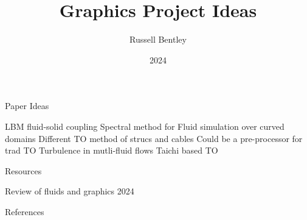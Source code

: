 \documentclass{beamer}
\title{Graphics Project Ideas}
\author{Russell Bentley}
\institute{Stony Brook}
\date{2024}
\begin{document}
\frame{\titlepage}

\begin{frame}{Paper Ideas}
\begin{outline}
\1 LBM fluid-solid coupling \cite{Lyu2021}
\1 Spectral method for Fluid simulation over curved domains \cite{Cui2021}
\1 Different TO method of strucs and cables \cite{Rowe2023}
  \2 Could be a pre-processor for trad TO
\1 Turbulence in mutli-fluid flows \cite{Li2024}
\1 Taichi based TO \cite{Liu2018}
\end{outline}
\end{frame}

\begin{frame}{Resources}
  \begin{outline}
  \1 Review of fluids and graphics 2024 \cite{Wang2024}
  \end{outline}
\end{frame}

\begin{frame}[allowframebreaks]{References}
    \tiny
    \printbibliography
\end{frame}
\end{document}
